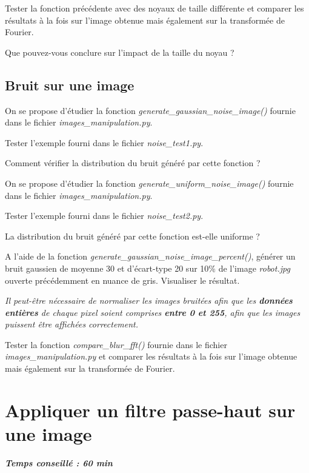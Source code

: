 \documentclass[a4paper,11pt,titlepage]{article} %
\begin{document}
\Manip Tester la fonction précédente avec des noyaux de taille différente et comparer les résultats à la fois sur l'image obtenue mais également sur la transformée de Fourier.

\Quest Que pouvez-vous conclure sur l'impact de la taille du noyau ?


\subsection{Bruit sur une image}

On se propose d'étudier la fonction \textsl{generate\_gaussian\_noise\_image()} fournie dans le fichier \textsl{images\_manipulation.py}.

\Manip Tester l'exemple fourni dans le fichier \textsl{noise\_test1.py}.

\Quest Comment vérifier la distribution du bruit généré par cette fonction ?

\medskip

On se propose d'étudier la fonction \textsl{generate\_uniform\_noise\_image()} fournie dans le fichier \textsl{images\_manipulation.py}.

\Manip Tester l'exemple fourni dans le fichier \textsl{noise\_test2.py}.

\Quest La distribution du bruit généré par cette fonction est-elle uniforme ?

\Manip A l'aide de la fonction \textsl{generate\_gaussian\_noise\_image\_percent()}, générer un bruit gaussien de moyenne 30 et d'écart-type 20 sur 10\% de l'image \textsl{robot.jpg} ouverte précédemment en nuance de gris. Visualiser le résultat.

\medskip

\textit{Il peut-être nécessaire de normaliser les images bruitées afin que les \textbf{données entières} de chaque pixel soient comprises \textbf{entre 0 et 255}, afin que les images puissent être affichées correctement.} 

\Manip Tester la fonction \textsl{compare\_blur\_fft()} fournie dans le fichier \textsl{images\_manipulation.py} et comparer les résultats à la fois sur l'image obtenue mais également sur la transformée de Fourier.


\section{Appliquer un filtre passe-haut sur une image}

\begin{center} \textbf{\textit{Temps conseillé : 60 min}} \end{center}
\end{document}
